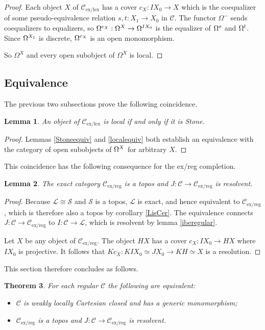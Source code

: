 \documentclass[sort&compress]{elsarticle}
\theoremstyle{plain}
\newtheorem{theorem}{Theorem}
\newtheorem{lemma}[theorem]{Lemma}
\theoremstyle{definition}
\theoremstyle{remark}
\newcommand\cat\mathcal
\newcommand\exlex{_\mathrm{ex/lex}}\newcommand\exreg{_\mathrm{ex/reg}}
\begin{document}
\begin{proof}
Each object $X$ of $\cat C\exlex$ has a cover $c_X:IX_0\to X$ which is the coequalizer of some pseudo-equivalence relation $s,t:X_1 \to X_0$ in $\cat C$. The functor $\Omega^-$ sends coequalizers to equalizers, so $\Omega^{c_X}:\Omega^{X} \to \Omega^{IX_0}$ is the equalizer of $\Omega^ s$ and $\Omega^ t$. Since $\Omega^ {X_1}$ is discrete, $\Omega^{c_X}$ is an open monomorphism.

So $\Omega^X$ and every open subobject of $\Omega^X$ is local.
\end{proof}

\subsection{Equivalence}
The previous two subsections prove the following coincidence.

\begin{lemma} An object of $\cat C\exlex$ is local if and only if it is Stone. \end{lemma}

\begin{proof} Lemmas \ref{Stoneequiv} and \ref{localequiv} both establish an equivalence with the category of open subobjects of $\Omega^{X}$ for arbitrary $X$. \end{proof}

This coincidence has the following consequence for the ex/reg completion.

\begin{lemma} The exact category $\cat C\exreg$ is a topos and $J:\cat C \to \cat C\exreg$ is resolvent. \end{lemma}

\begin{proof} Because $\cat L\cong \cat S$ and $\cat S$ is a topos, $\cat L$ is exact, and hence equivalent to $\cat C\exreg$, which is therefore also a topos by corollary \ref{LisCer}. The equivalence connects $J:\cat C \to\cat C\exreg$ to $I:\cat C \to \cat L$, which is resolvent by lemma \ref{iberegular}.

Let $X$ be any object of $\cat C\exreg$. The object $HX$ has a cover $c_X:IX_0 \to HX$ where $IX_0$ is projective. It follows that $Kc_X: KIX_0\simeq JX_0\to KH\simeq X$ is a resolution. 
\end{proof}

This section therefore concludes as follows.

\begin{theorem} For each regular $\cat C$ the following are equivalent:
\begin{itemize}
\item $\cat C$ is weakly locally Cartesian closed and has a generic monomorphism;
\item $\cat C\exreg$ is a topos and $J:\cat C \to\cat C\exreg$ is resolvent.
\end{itemize}\label{ThB}
\end{theorem}
\end{document}
